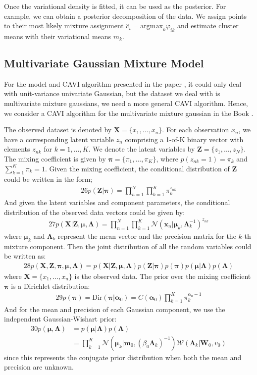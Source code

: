 \documentclass[letterpaper]{article}
\newcommand{\bx}{\mathbf{x}}
\newcommand{\bmu}{\boldsymbol{\mu}}
\newcommand{\calN}{\mathcal{N}}
\newcommand{\bZ}{\mathbf{Z}}
\newcommand{\bpi}{\boldsymbol{\pi}}
\newcommand{\bX}{\mathbf{X}}
\newcommand{\bLambda}{\boldsymbol{\Lambda}}
\newcommand{\calW}{\mathcal{W}}
\newcommand{\balpha}{\boldsymbol{\alpha}}
\newcommand{\prodn}{\prod_{n=1}^N}
\newcommand{\prodk}{\prod_{k=1}^K}
\begin{document}
Once the variational density is fitted, it can be used as the posterior. For example, we can obtain a posterior decomposition of the data. We assign points to their most likely mixture assignment $\hat{c}_i = \mathrm{argmax}_k \varphi_{ik}$ and estimate cluster means with their variational means $m_k$.

\subsection{Multivariate Gaussian Mixture Model}

For the model and CAVI algorithm presented in the paper \citep{blei2017variational}, it could only deal with unit-variance univariate Gaussian, but the dataset we deal with is multivariate mixture gaussians, we need a more general CAVI algorithm. Hence, we consider a CAVI algorithm for the multivariate mixture gaussian in the Book \citep{nasrabadi2007pattern}. 

The observed dataset is denoted by $\textbf{X} = \{x_1, \dots, x_n\}$. For each observation $x_n$, we have a corresponding latent variable $z_n$ comprising a 1-of-K binary vector with elements $z_{nk}$ for $k = 1,\ldots,K$. We denote the latent variables by $\textbf{Z} = \{z_1, \ldots, z_N\}$. The mixing coefficient is given by $\bpi = \{\pi_1,\ldots, \pi_K\}$,  where $p(z_{nk} = 1) = \pi_k$ and $\sum_{k = 1}^K\pi_k = 1$. Given the mixing coefficient, the conditional distribution of $\textbf{Z}$ could be written in the form;
\begin{alignat}{26}
p(\bZ | \bpi) = \prodn \prodk \pi_k^{z_{nk}}
\end{alignat}
And given the latent variables and component parameters, the conditional distribution of the observed data vectors could be given by:
\begin{alignat}{27}
p(\bX | \bZ, \bmu, \bLambda) = \prodn \prodk \calN (\bx_n | \bmu_k, \bLambda_k^{-1})^{z_{nk}}
\end{alignat}
where $\bmu_k$ and $\bLambda_k$ represent the mean vector and the precision matrix for the $k$-th mixture component. Then the joint distribution of all the random variables could be written as:
\begin{alignat}{28}
p(\bX, \bZ, \bpi, \bmu, \bLambda) = p(\bX | \bZ, \bmu, \bLambda) p(\bZ | \bpi) p(\bpi) p(\bmu | \bLambda) p(\bLambda)
\end{alignat}
where $\textbf{X} = \{x_1, \dots, x_n\}$ is the observed data. The prior over the mixing coefficient $\bpi$ is a Dirichlet distribution:
\begin{alignat}{29}\label{eq:29}
p(\bpi) = \mathrm{Dir}(\bpi | \balpha_0) = C(\balpha_0) \prodk \pi_k^{\alpha_0 -1}
\end{alignat} 
And for the mean and precision of each Gaussian component, we use the independent Gaussian-Wishart prior:
\begin{alignat}{30}
p(\bmu, \bLambda) &= p(\bmu | \bLambda)p(\bLambda) \label{eq:30}\\
& = \prodk \calN (\bmu_k | \mathbf{m}_0, (\beta_0 \bLambda_k)^{-1}) \calW (\bLambda_k | \mathbf{W}_0, v_0) \label{eq:31}
\end{alignat}
since this represents the conjugate prior distribution when both the mean and precision are unknown.
\end{document}
